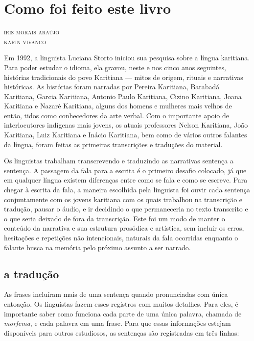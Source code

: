 \chapter{Como foi feito este livro}

\begin{flushright}
\textsc{íris morais araújo}\\
\textsc{karin vivanco}
\end{flushright}

\noindent{}Em 1992, a linguista Luciana Storto
iniciou sua pesquisa sobre a língua karitiana. Para poder estudar o
idioma, ela gravou, neste e nos cinco anos seguintes, histórias
tradicionais do povo Karitiana --- mitos de origem, rituais e narrativas
históricas. As histórias foram narradas por Pereira Karitiana, Barabadá
Karitiana, Garcia Karitiana, Antonio Paulo Karitiana, Cizino Karitiana,
Joana Karitiana e Nazaré Karitiana, alguns dos homens e mulheres mais
velhos de então, tidos como conhecedores da arte verbal. Com o
importante apoio de interlocutores indígenas mais jovens, os atuais
professores Nelson Karitiana, João Karitiana, Luiz Karitiana e Inácio
Karitiana, bem como de vários outros falantes da língua, foram feitas as
primeiras transcrições e traduções do material.

Os linguistas trabalham transcrevendo e traduzindo as narrativas
sentença a sentença. A passagem da fala para a escrita é o primeiro
desafio colocado, já que em qualquer língua existem diferenças entre
como se fala e como se escreve. Para chegar à escrita da fala, a maneira
escolhida pela linguista foi ouvir cada sentença conjuntamente com os
jovens karitiana com os quais trabalhou na transcrição e tradução,
pausar o áudio, e ir decidindo o que permaneceria no texto transcrito e
o que seria deixado de fora da transcrição. Este foi um modo de manter o
conteúdo da narrativa e sua estrutura prosódica e artística, sem incluir
os erros, hesitações e repetições não intencionais, naturais da fala
ocorridas enquanto o falante busca na memória pelo próximo assunto a ser
narrado.

\section{a tradução}

As frases incluíram mais de uma sentença quando pronunciadas com única entoação. Os linguistas fazem esses
registros com muitos detalhes. Para eles, é importante saber como
funciona cada parte de uma única palavra, chamada de \textit{morfema}, e
cada palavra em uma frase. Para que essas informações estejam
disponíveis para outros estudiosos, as sentenças são registradas em três
linhas: 

